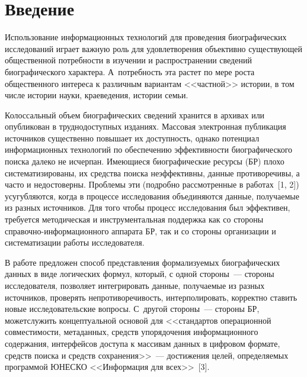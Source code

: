       \begin{multicols}{2}

            \label{st\stat}
  
\section{Введение}
  
  Использование информационных технологий для проведения 
биографических исследований играет важную роль для удовлетворения 
объективно существующей общественной потребности в изучении и 
распространении сведений биографического характера. А~потребность эта 
растет по мере роста общественного интереса к различным вариантам 
<<частной>> истории, в том числе истории науки, краеведения, истории семьи.
  
  Колоссальный объем биографических сведе\-ний хранится в архивах или 
опубликован в труд\-но\-доступных изданиях. Массовая электронная пуб\-ли\-кация 
источников существенно повышает их\linebreak
 доступность, однако потенциал 
информационных технологий по обеспечению эффективности\linebreak
 биографического 
поиска далеко не исчерпан. Име\-ющи\-еся биографические ресурсы (БР) плохо 
сис\-те\-ма\-тизированы, их средства поиска неэффективны, данные противоречивы, 
а часто и недостоверны. Проб\-ле\-мы эти (подробно рассмотренные в работах~[1, 2]) 
усугубляются, когда в процессе исследования объединяются данные, 
получаемые из разных источников. Для того чтобы процесс исследования был 
эффективен, требуется методическая и инструментальная поддержка как со 
стороны спра\-воч\-но-ин\-фор\-ма\-ци\-он\-но\-го аппарата БР, так и со стороны 
организации и систематизации работы исследователя. 
  
  В работе предложен способ представления формализуемых биографических 
данных в виде логических формул, который, с одной стороны~---\linebreak
стороны 
исследователя, позволяет интегрировать данные, получаемые из разных 
источников, проверять непротиворечивость, интерполировать, корректно 
ставить новые исследовательские вопросы. С~другой стороны~--- стороны БР, 
может\linebreak служить концептуальной основой для <<стандартов операционной 
совместимости, метаданных, средств упорядочения информационного 
содержания, интерфейсов доступа к массивам данных в\linebreak
 цифровом формате, 
средств поиска и средств сохранения>>~--- достижения целей, определяемых 
программой ЮНЕСКО <<Информация для всех>>~[3].
  

\end{multicols}
